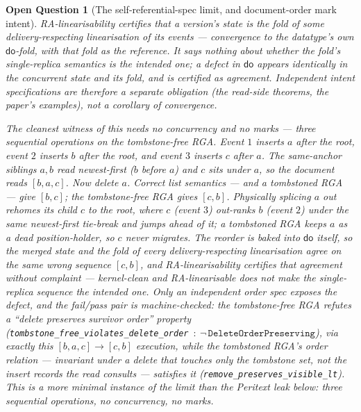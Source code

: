 \documentclass[11pt]{article}
\newtheorem{openq}[theorem]{Open Question}
\newcommand{\lean}[1]{\texttt{#1}}
\newcommand{\dodo}{\mathsf{do}}
\begin{document}
\begin{openq}[The self-referential-spec limit, and document-order mark intent]
\label{oq:linspec}
RA-linearisability certifies that a version's state is the fold of some
delivery-respecting linearisation of its events --- convergence to the
datatype's \emph{own} $\dodo$-fold, with that fold as the reference. It says
nothing about whether the fold's single-replica semantics is the intended
one; a defect in $\dodo$ appears identically in the concurrent state and its
fold, and is certified as agreement. Independent \emph{intent} specifications
are therefore a separate obligation (the read-side theorems, the paper's
examples), not a corollary of convergence.

The cleanest witness of this needs no concurrency and no marks --- three
sequential operations on the tombstone-free RGA. Event $1$ inserts $a$ after
the root, event $2$ inserts $b$ after the root, and event $3$ inserts $c$
after $a$. The same-anchor siblings $a,b$ read newest-first ($b$ before $a$)
and $c$ sits under $a$, so the document reads $[b,a,c]$. Now delete $a$.
Correct list semantics --- and a tombstoned RGA --- give $[b,c]$; the
tombstone-free RGA gives $[c,b]$. Physically splicing $a$ out rehomes its
child $c$ to the root, where $c$ (event $3$) out-ranks $b$ (event $2$) under
the same newest-first tie-break and jumps ahead of it; a tombstoned RGA keeps
$a$ as a dead position-holder, so $c$ never migrates. The reorder is baked
into $\dodo$ itself, so the merged state and the fold of \emph{every}
delivery-respecting linearisation agree on the same wrong sequence $[c,b]$,
and RA-linearisability certifies that agreement without complaint ---
kernel-clean and RA-linearisable does not make the single-replica sequence
the intended one. Only an independent order spec exposes the defect, and the
fail/pass pair is machine-checked: the tombstone-free RGA \emph{refutes} a
``delete preserves survivor order'' property
(\lean{tombstone\_free\_violates\_delete\_order}~$:\
\neg\,\lean{DeleteOrderPreserving}$), via exactly this
$[b,a,c]\!\to\![c,b]$ execution, while the tombstoned RGA's order relation
--- invariant under a delete that touches only the tombstone set, not the
insert records the read consults --- \emph{satisfies} it
(\lean{remove\_preserves\_visible\_lt}). This is a more minimal instance of
the limit than the Peritext leak below: three sequential operations, no
concurrency, no marks.


\end{openq}
\end{document}
